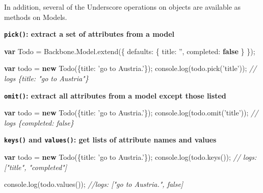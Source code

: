 \documentclass[9pt]{book}
\newenvironment{Shaded}{}{}
\newcommand{\KeywordTok}[1]{\textcolor[rgb]{0.00,0.44,0.13}{\textbf{{#1}}}}
\newcommand{\DataTypeTok}[1]{\textcolor[rgb]{0.56,0.13,0.00}{{#1}}}
\newcommand{\StringTok}[1]{\textcolor[rgb]{0.25,0.44,0.63}{{#1}}}
\newcommand{\CommentTok}[1]{\textcolor[rgb]{0.38,0.63,0.69}{\textit{{#1}}}}
\newcommand{\OtherTok}[1]{\textcolor[rgb]{0.00,0.44,0.13}{{#1}}}
\newcommand{\FunctionTok}[1]{\textcolor[rgb]{0.02,0.16,0.49}{{#1}}}
\newcommand{\NormalTok}[1]{{#1}}
\begin{document}
In addition, several of the Underscore operations on objects are
available as methods on Models.

\textbf{\texttt{pick()}: extract a set of attributes from a model}

\begin{Shaded}
\begin{Highlighting}[]
\KeywordTok{var} \NormalTok{Todo = }\OtherTok{Backbone}\NormalTok{.}\OtherTok{Model}\NormalTok{.}\FunctionTok{extend}\NormalTok{(\{}
  \DataTypeTok{defaults}\NormalTok{: \{}
    \DataTypeTok{title}\NormalTok{: }\StringTok{''}\NormalTok{,}
    \DataTypeTok{completed}\NormalTok{: }\KeywordTok{false}
  \NormalTok{\}}
\NormalTok{\});}

\KeywordTok{var} \NormalTok{todo = }\KeywordTok{new} \FunctionTok{Todo}\NormalTok{(\{}\DataTypeTok{title}\NormalTok{: }\StringTok{'go to Austria.'}\NormalTok{\});}
\OtherTok{console}\NormalTok{.}\FunctionTok{log}\NormalTok{(}\OtherTok{todo}\NormalTok{.}\FunctionTok{pick}\NormalTok{(}\StringTok{'title'}\NormalTok{));}
\CommentTok{// logs \{title: "go to Austria"\}}
\end{Highlighting}
\end{Shaded}

\textbf{\texttt{omit()}: extract all attributes from a model except
those listed}

\begin{Shaded}
\begin{Highlighting}[]
\KeywordTok{var} \NormalTok{todo = }\KeywordTok{new} \FunctionTok{Todo}\NormalTok{(\{}\DataTypeTok{title}\NormalTok{: }\StringTok{'go to Austria.'}\NormalTok{\});}
\OtherTok{console}\NormalTok{.}\FunctionTok{log}\NormalTok{(}\OtherTok{todo}\NormalTok{.}\FunctionTok{omit}\NormalTok{(}\StringTok{'title'}\NormalTok{));}
\CommentTok{// logs \{completed: false\}}
\end{Highlighting}
\end{Shaded}

\textbf{\texttt{keys()} and \texttt{values()}: get lists of attribute
names and values}

\begin{Shaded}
\begin{Highlighting}[]
\KeywordTok{var} \NormalTok{todo = }\KeywordTok{new} \FunctionTok{Todo}\NormalTok{(\{}\DataTypeTok{title}\NormalTok{: }\StringTok{'go to Austria.'}\NormalTok{\});}
\OtherTok{console}\NormalTok{.}\FunctionTok{log}\NormalTok{(}\OtherTok{todo}\NormalTok{.}\FunctionTok{keys}\NormalTok{());}
\CommentTok{// logs: ["title", "completed"]}

\OtherTok{console}\NormalTok{.}\FunctionTok{log}\NormalTok{(}\OtherTok{todo}\NormalTok{.}\FunctionTok{values}\NormalTok{());}
\CommentTok{//logs: ["go to Austria.", false]}
\end{Highlighting}
\end{Shaded}
\end{document}
